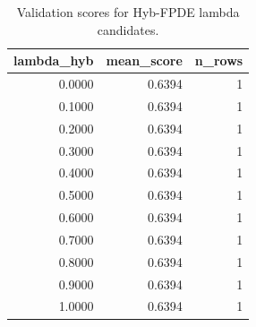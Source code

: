 \begin{table}[t]
\caption{Validation scores for Hyb-FPDE lambda candidates.}
\label{tab:lambda_distribution_computed}
\centering
\begin{tabular}{rrr}
\toprule
lambda\_hyb & mean\_score & n\_rows \\
\midrule
0.0000 & 0.6394 & 1 \\
0.1000 & 0.6394 & 1 \\
0.2000 & 0.6394 & 1 \\
0.3000 & 0.6394 & 1 \\
0.4000 & 0.6394 & 1 \\
0.5000 & 0.6394 & 1 \\
0.6000 & 0.6394 & 1 \\
0.7000 & 0.6394 & 1 \\
0.8000 & 0.6394 & 1 \\
0.9000 & 0.6394 & 1 \\
1.0000 & 0.6394 & 1 \\
\bottomrule
\end{tabular}

\end{table}
